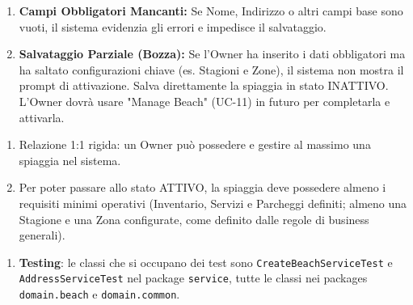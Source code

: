 \documentclass{article}
\begin{document}
	{
		\begin{enumerate}[nosep, leftmargin=25px]
			\item[\textbf{9a-e.}] \textbf{Campi Obbligatori Mancanti:} Se Nome, Indirizzo o altri campi base sono vuoti, il sistema evidenzia gli errori e impedisce il salvataggio.
			\item[\textbf{10a.}] \textbf{Salvataggio Parziale (Bozza):} Se l'Owner ha inserito i dati obbligatori ma ha saltato configurazioni chiave (es. Stagioni e Zone), il sistema non mostra il prompt di attivazione. Salva direttamente la spiaggia in stato INATTIVO. L'Owner dovrà usare "Manage Beach" (UC-11) in futuro per completarla e attivarla.
		\end{enumerate}
	}
	{
		\begin{enumerate}[nosep, leftmargin=*]
			\item[•] Relazione 1:1 rigida: un Owner può possedere e gestire al massimo una spiaggia nel sistema.
			\item[•] Per poter passare allo stato ATTIVO, la spiaggia deve possedere almeno i requisiti minimi operativi (Inventario, Servizi e Parcheggi definiti; almeno una Stagione e una Zona configurate, come definito dalle regole di business generali).
		\end{enumerate}
		
		\begin{enumerate}[leftmargin=*]
			\item[•] \textbf{Testing}: le classi che si occupano dei test sono \texttt{CreateBeachServiceTest} e \texttt{AddressServiceTest} nel package \texttt{service}, tutte le classi nei packages \texttt{domain.beach} e \texttt{domain.common}.
		\end{enumerate}
	}
		
	\newpage
	
\end{document}
